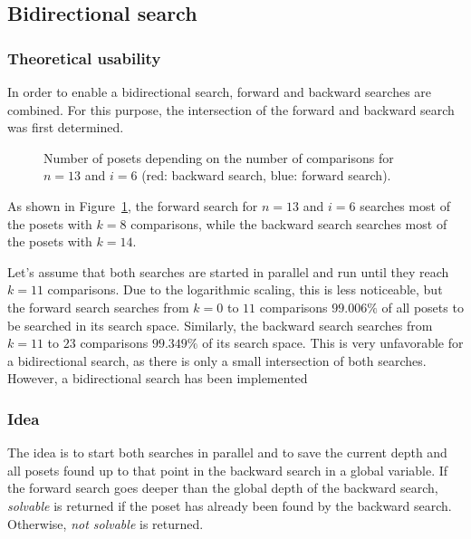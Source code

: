 \documentclass[twoside,leqno,twocolumn]{article}
\begin{document}
\subsection{Bidirectional search} \label{sec:bidirectional}

\subsubsection{Theoretical usability}

In order to enable a bidirectional search, forward and backward searches are combined.
For this purpose, the intersection of the forward and backward search was first determined.

\begin{figure}[!b]
  \centering
  
  \caption{Number of posets depending on the number of comparisons for $n = 13$ and $i = 6$ (red: backward search, blue: forward search).}
  \label{fig:backward_forward_count_13_6}
\end{figure}

As shown in Figure~\ref{fig:backward_forward_count_13_6}, the forward search for $n = 13$ and $i = 6$ searches most of the posets with $k = 8$ comparisons, while the backward search searches most of the posets with $k = 14$.

Let's assume that both searches are started in parallel and run until they reach $k = 11$ comparisons.
Due to the logarithmic scaling, this is less noticeable, but the forward search searches from $k = 0$ to $11$ comparisons $99.006\%$ of all posets to be searched in its search space.
Similarly, the backward search searches from $k = 11$ to $23$ comparisons $99.349\%$ of its search space.
This is very unfavorable for a bidirectional search, as there is only a small intersection of both searches.
However, a bidirectional search has been implemented

\subsubsection{Idea}

The idea is to start both searches in parallel and to save the current depth and all posets found up to that point in the backward search in a global variable.
If the forward search goes deeper than the global depth of the backward search, \textit{solvable} is returned if the poset has already been found by the backward search.
Otherwise, \textit{not solvable} is returned.
\end{document}

